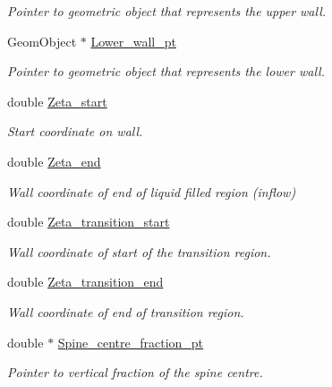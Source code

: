 \begin{DoxyCompactItemize}
\begin{DoxyCompactList}\small\item\em Pointer to geometric object that represents the upper wall. \end{DoxyCompactList}\item 
Geom\+Object $\ast$ \hyperlink{classoomph_1_1BrethertonSpineMesh_a04c0136de66c06a34347b89f453730e1}{Lower\+\_\+wall\+\_\+pt}
\begin{DoxyCompactList}\small\item\em Pointer to geometric object that represents the lower wall. \end{DoxyCompactList}\item 
double \hyperlink{classoomph_1_1BrethertonSpineMesh_a0f41083aa9a97fca03d498bd6ec21eb2}{Zeta\+\_\+start}
\begin{DoxyCompactList}\small\item\em Start coordinate on wall. \end{DoxyCompactList}\item 
double \hyperlink{classoomph_1_1BrethertonSpineMesh_ac1b5e005bfb5db65f54ca599942126ea}{Zeta\+\_\+end}
\begin{DoxyCompactList}\small\item\em Wall coordinate of end of liquid filled region (inflow) \end{DoxyCompactList}\item 
double \hyperlink{classoomph_1_1BrethertonSpineMesh_af701937d59d7804f40cb1b4c7a262391}{Zeta\+\_\+transition\+\_\+start}
\begin{DoxyCompactList}\small\item\em Wall coordinate of start of the transition region. \end{DoxyCompactList}\item 
double \hyperlink{classoomph_1_1BrethertonSpineMesh_a1d05bb741eba54ab7498ab4f3c55f1b7}{Zeta\+\_\+transition\+\_\+end}
\begin{DoxyCompactList}\small\item\em Wall coordinate of end of transition region. \end{DoxyCompactList}\item 
double $\ast$ \hyperlink{classoomph_1_1BrethertonSpineMesh_af5e7951a89bc13d73f2b137947cda8a3}{Spine\+\_\+centre\+\_\+fraction\+\_\+pt}
\begin{DoxyCompactList}\small\item\em Pointer to vertical fraction of the spine centre. \end{DoxyCompactList}\item 

\end{DoxyCompactItemize}
